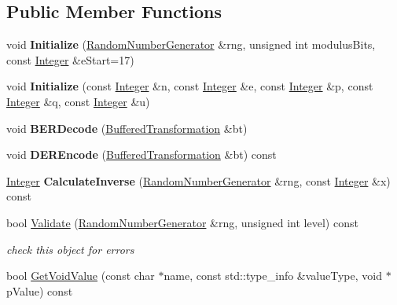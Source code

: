 \subsection*{Public Member Functions}
\begin{DoxyCompactItemize}
\item 
\hypertarget{class_invertible_l_u_c_function_aed7fd0c49f5703c4f041d2f265fa2de8}{
void {\bfseries Initialize} (\hyperlink{class_random_number_generator}{RandomNumberGenerator} \&rng, unsigned int modulusBits, const \hyperlink{class_integer}{Integer} \&eStart=17)}
\label{class_invertible_l_u_c_function_aed7fd0c49f5703c4f041d2f265fa2de8}

\item 
\hypertarget{class_invertible_l_u_c_function_a9e44c5b8fbd909c18d5422436c14a505}{
void {\bfseries Initialize} (const \hyperlink{class_integer}{Integer} \&n, const \hyperlink{class_integer}{Integer} \&e, const \hyperlink{class_integer}{Integer} \&p, const \hyperlink{class_integer}{Integer} \&q, const \hyperlink{class_integer}{Integer} \&u)}
\label{class_invertible_l_u_c_function_a9e44c5b8fbd909c18d5422436c14a505}

\item 
\hypertarget{class_invertible_l_u_c_function_a13ccaed129529b72b293c93e83ad726f}{
void {\bfseries BERDecode} (\hyperlink{class_buffered_transformation}{BufferedTransformation} \&bt)}
\label{class_invertible_l_u_c_function_a13ccaed129529b72b293c93e83ad726f}

\item 
\hypertarget{class_invertible_l_u_c_function_ae6da11b6ee13f6c12fd95592bdda95ad}{
void {\bfseries DEREncode} (\hyperlink{class_buffered_transformation}{BufferedTransformation} \&bt) const }
\label{class_invertible_l_u_c_function_ae6da11b6ee13f6c12fd95592bdda95ad}

\item 
\hypertarget{class_invertible_l_u_c_function_a0b8820769716f340ad154a428b53907e}{
\hyperlink{class_integer}{Integer} {\bfseries CalculateInverse} (\hyperlink{class_random_number_generator}{RandomNumberGenerator} \&rng, const \hyperlink{class_integer}{Integer} \&x) const }
\label{class_invertible_l_u_c_function_a0b8820769716f340ad154a428b53907e}

\item 
bool \hyperlink{class_invertible_l_u_c_function_ad6390a95a003eceef45cc238f538c4d8}{Validate} (\hyperlink{class_random_number_generator}{RandomNumberGenerator} \&rng, unsigned int level) const 
\begin{DoxyCompactList}\small\item\em check this object for errors \item\end{DoxyCompactList}\item 
\hypertarget{class_invertible_l_u_c_function_a882c26c94e15ecb1added6f3fafae021}{
bool \hyperlink{class_invertible_l_u_c_function_a882c26c94e15ecb1added6f3fafae021}{GetVoidValue} (const char $\ast$name, const std::type\_\-info \&valueType, void $\ast$pValue) const }
\label{class_invertible_l_u_c_function_a882c26c94e15ecb1added6f3fafae021}


\end{DoxyCompactItemize}
